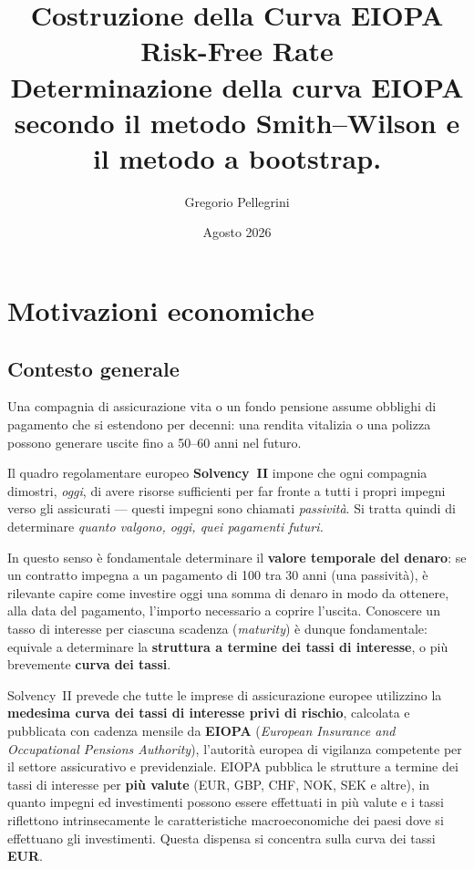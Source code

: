 \documentclass[11pt,a4paper]{article}
\title{%
  \textbf{Costruzione della Curva EIOPA Risk-Free Rate}\\[6pt]
  \large Determinazione della curva EIOPA secondo il metodo Smith--Wilson e il metodo a bootstrap.\\[4pt]
}
\author{Gregorio Pellegrini}
\date{Agosto 2026}
\theoremstyle{plain}
\theoremstyle{definition}
\theoremstyle{remark}
\begin{document}
\maketitle
\tableofcontents
\newpage

\section{Motivazioni economiche}

\subsection{Contesto generale}

Una compagnia di assicurazione vita o un fondo pensione assume obblighi di pagamento che si
estendono per decenni: una rendita vitalizia o una polizza possono generare uscite fino a
50--60 anni nel futuro.

Il quadro regolamentare europeo \textbf{Solvency~II} impone che ogni compagnia dimostri,
\emph{oggi}, di avere risorse sufficienti per far fronte a tutti i propri impegni verso gli
assicurati --- questi impegni sono chiamati \emph{passivit\`a}. Si tratta quindi di determinare \emph{quanto
valgono, oggi, quei pagamenti futuri.}

In questo senso \`e fondamentale determinare il \textbf{valore temporale del denaro}: se un
contratto impegna a un pagamento di 100 tra 30 anni (una passivit\`a), \`e rilevante capire
come investire oggi una somma di denaro in modo da ottenere, alla data del pagamento,
l'importo necessario a coprire l'uscita. Conoscere un tasso di interesse per ciascuna
scadenza (\emph{maturity}) \`e dunque fondamentale: equivale a determinare la \textbf{struttura
a termine dei tassi di interesse}, o pi\`u brevemente \textbf{curva dei tassi}.

Solvency~II prevede che tutte le imprese di assicurazione europee utilizzino la \textbf{medesima
curva dei tassi di interesse privi di rischio}, calcolata e pubblicata con cadenza mensile da
\textbf{EIOPA} (\emph{European Insurance and Occupational Pensions Authority}), l'autorit\`a
europea di vigilanza competente per il settore assicurativo e previdenziale. EIOPA pubblica le
strutture a termine dei tassi di interesse per \textbf{pi\`u valute} (EUR, GBP, CHF, NOK, SEK e
altre), in quanto impegni ed investimenti possono essere effettuati in più valute e 
i tassi riflettono intrinsecamente le caratteristiche macroeconomiche dei paesi dove si effettuano gli investimenti.
Questa dispensa si concentra sulla curva dei tassi \textbf{EUR}.
\end{document}
